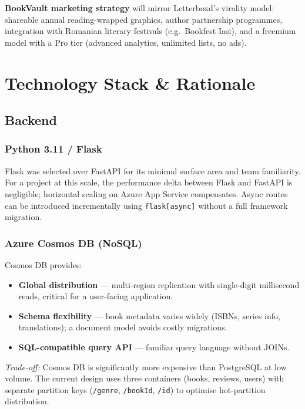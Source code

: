 \documentclass[12pt, a4paper]{report}
\begin{document}
\textbf{BookVault marketing strategy} will mirror Letterboxd's virality model:
shareable annual reading-wrapped graphics, author partnership programmes, integration with
Romanian literary festivals (e.g.\ Bookfest Iași), and a freemium model with a Pro tier
(advanced analytics, unlimited lists, no ads).

\chapter{Technology Stack \& Rationale}

\section{Backend}

\subsection{Python 3.11 / Flask}

Flask was selected over FastAPI for its minimal surface area and team familiarity.
For a project at this scale, the performance delta between Flask and FastAPI is negligible;
horizontal scaling on Azure App Service compensates. Async routes can be introduced
incrementally using \texttt{flask[async]} without a full framework migration.

\subsection{Azure Cosmos DB (NoSQL)}

Cosmos DB provides:
\begin{itemize}[nosep]
  \item \textbf{Global distribution} — multi-region replication with single-digit millisecond
    reads, critical for a user-facing application.
  \item \textbf{Schema flexibility} — book metadata varies widely (ISBNs, series info,
    translations); a document model avoids costly migrations.
  \item \textbf{SQL-compatible query API} — familiar query language without JOINs.
\end{itemize}

\textit{Trade-off:} Cosmos DB is significantly more expensive than PostgreSQL at low
volume. The current design uses three containers (books, reviews, users) with separate
partition keys (\texttt{/genre}, \texttt{/bookId}, \texttt{/id}) to optimise hot-partition
distribution.
\end{document}
